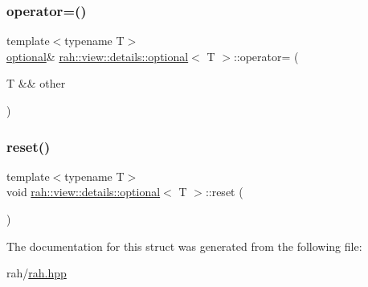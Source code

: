 \subsubsection{\texorpdfstring{operator=()}{operator=()}\hspace{0.1cm}{\footnotesize\ttfamily [4/4]}}
{\footnotesize\ttfamily template$<$typename T$>$ \\
\mbox{\hyperlink{structrah_1_1view_1_1details_1_1optional}{optional}}\& \mbox{\hyperlink{structrah_1_1view_1_1details_1_1optional}{rah\+::view\+::details\+::optional}}$<$ T $>$\+::operator= (\begin{DoxyParamCaption}\item[{T \&\&}]{other }\end{DoxyParamCaption})\hspace{0.3cm}{\ttfamily [inline]}}

\mbox{\label{structrah_1_1view_1_1details_1_1optional_a3df63c25ba76b31c003c2faa70554ae7}} 
\subsubsection{\texorpdfstring{reset()}{reset()}}
{\footnotesize\ttfamily template$<$typename T$>$ \\
void \mbox{\hyperlink{structrah_1_1view_1_1details_1_1optional}{rah\+::view\+::details\+::optional}}$<$ T $>$\+::reset (\begin{DoxyParamCaption}{ }\end{DoxyParamCaption})\hspace{0.3cm}{\ttfamily [inline]}}



The documentation for this struct was generated from the following file\+:\begin{DoxyCompactItemize}
\item 
rah/\mbox{\hyperlink{rah_8hpp}{rah.\+hpp}}\end{DoxyCompactItemize}
